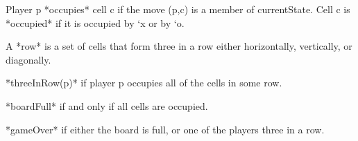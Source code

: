 \documentclass{led_doc}
\begin{document}
\begin{ledDef}
\end{ledDef}

\begin{ledCmnt}
Player p *occupies* cell c if the move (p,c) is a member of currentState. Cell c is *occupied* if it is occupied by `x or by `o.
\end{ledCmnt}

\begin{ledDef}
\end{ledDef}

\begin{ledDef}
\end{ledDef}

\begin{ledCmnt}
A *row* is a set of cells that form three in a row either horizontally, vertically, or diagonally.
\end{ledCmnt}

\begin{ledDef}
\end{ledDef}

\begin{ledCmnt}
*threeInRow(p)* if player p occupies all of the cells in some row.
\end{ledCmnt}

\begin{ledDef}
\end{ledDef}

\begin{ledCmnt}
*boardFull* if and only if all cells are occupied.
\end{ledCmnt}

\begin{ledDef}
\end{ledDef}

\begin{ledCmnt}
*gameOver* if either the board is full, or one of the players three in a row.
\end{ledCmnt}
\end{document}
